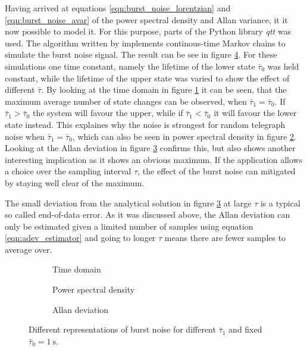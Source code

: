 Having arrived at equations \ref{eqn:burst_noise_lorentzian} and \ref{eqn:burst_noise_avar} of the power spectral density and Allan variance, it it now possible to model it. For this purpose, parts of the Python library \textit{qtt} \cite{qtt} was used. The algorithm written by \citeauthor{qtt} implements continous-time Markov chains to simulate the burst noise signal. The result can be see in figure \ref{fig:burst_noise_simulated}. For these simulations one time constant, namely the lifetime of the lower state $\bar \tau_0$ was held constant, while the lifetime of the upper state was varied to show the effect of different $\bar \tau$. By looking at the time domain in figure \ref{fig:burst_noise_time} it can be seen, that the maximum average number of state changes can be observed, when $\bar \tau_1 = \bar \tau_0$. If $\bar \tau_1 > \bar \tau_0$ the system will favour the upper, while if $\bar \tau_1 < \bar \tau_0$ it will favour the lower state instead. This explaines why the noise is strongest for random telegraph noise when $\bar \tau_1 = \bar \tau_0$, which can also be seen in power spectral density in figure \ref{fig:burst_noise_psd}. Looking at the Allan deviation in figure \ref{fig:burst_noise_adev} confirms this, but also shows another interesting implication as it shows an obvious maximum. If the application allows a choice over the sampling interval $\tau$, the effect of the burst noise can mitigated by staying well clear of the maximum.

The small deviation from the analytical solution in figure \ref{fig:burst_noise_adev}  at large $\tau$ is a typical so called end-of-data error. As it was discussed above, the Allan deviation can only be estimated given a limited number of samples using equation \ref{eqn:adev_estimator} and going to longer $\tau$ means there are fewer samples to average over.

\begin{figure}[ht]
    \centering
    \begin{subfigure}{0.8\linewidth}
        \centering
        \scalebox{1}{%
            
        } %
        \caption{Time domain}
        \label{fig:burst_noise_time}
    \end{subfigure}
    \begin{subfigure}{0.8\linewidth}
        \centering
        \scalebox{1}{%
            
        } %
        \caption{Power spectral density}
        \label{fig:burst_noise_psd}
    \end{subfigure}
    \begin{subfigure}{0.8\linewidth}
        \centering
        \scalebox{1}{%
            
        } %
        \caption{Allan deviation}
        \label{fig:burst_noise_adev}
    \end{subfigure}
    \caption{Different representations of burst noise for different $\bar \tau_1$ and fixed $\bar \tau_0 = \qty{1}{\s}$.}
    \label{fig:burst_noise_simulated}
\end{figure}

